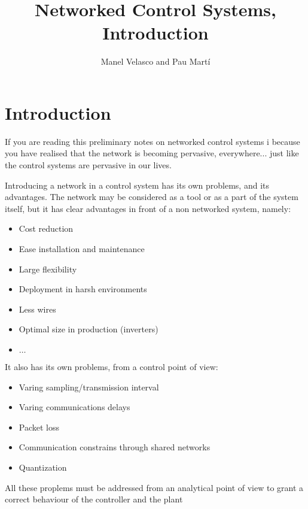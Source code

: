 \documentclass[nols]{tufte-handout}
\title{Networked Control Systems, Introduction} %
\author[Manel Velasco and Pau Martí]{Manel Velasco and Pau Martí} %
\theoremstyle{definition}
\newcommand{\chapter}[1]{\section{#1}}
\begin{document}
\maketitle
\setcounter{secnumdepth}{2}

\else

\fi






\chapter{Introduction}

If you are reading this preliminary notes on networked control systems i because you have realised that the network is becoming pervasive, everywhere... just like the control systems are pervasive in our lives. 

Introducing a network in a control system has its own problems, and its advantages. The network may be considered as a tool or as a part of the system itself, but it has clear advantages in front of a non networked system, namely:
\begin{itemize}
    \item Cost reduction
        \item Ease installation and maintenance
        \item Large flexibility
        \item Deployment in harsh environments
        \item Less wires
        \item Optimal size in production (inverters)
        \item $\dots$

\end{itemize}

It also has its own problems, from a control point of view:
\begin{itemize}
    \item Varing sampling/transmission interval
    \item Varing communications delays
    \item Packet loss
    \item Communication constrains through shared networks
    \item Quantization 
\end{itemize}

All these proplems  must be addressed from an analytical point of view to grant a correct behaviour of the controller and the plant
\end{document}
